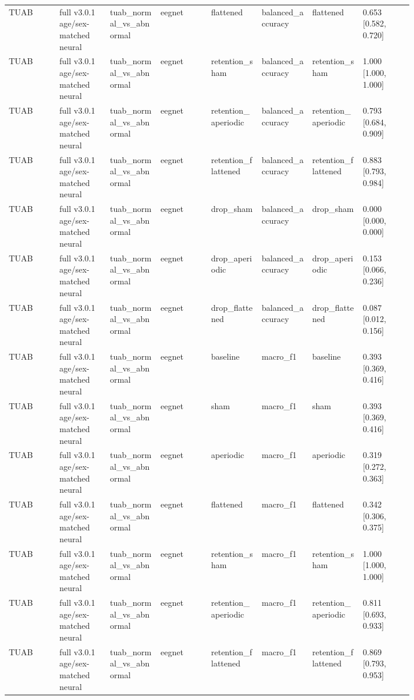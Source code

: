 \begin{longtable}{p{0.10\linewidth}p{0.10\linewidth}p{0.10\linewidth}p{0.10\linewidth}p{0.10\linewidth}p{0.10\linewidth}p{0.10\linewidth}p{0.10\linewidth}}
TUAB & full v3.0.1 age/sex-matched neural & tuab\_normal\_vs\_abnormal & eegnet & flattened & balanced\_accuracy & flattened & 0.653 [0.582, 0.720]\\
TUAB & full v3.0.1 age/sex-matched neural & tuab\_normal\_vs\_abnormal & eegnet & retention\_sham & balanced\_accuracy & retention\_sham & 1.000 [1.000, 1.000]\\
TUAB & full v3.0.1 age/sex-matched neural & tuab\_normal\_vs\_abnormal & eegnet & retention\_aperiodic & balanced\_accuracy & retention\_aperiodic & 0.793 [0.684, 0.909]\\
TUAB & full v3.0.1 age/sex-matched neural & tuab\_normal\_vs\_abnormal & eegnet & retention\_flattened & balanced\_accuracy & retention\_flattened & 0.883 [0.793, 0.984]\\
TUAB & full v3.0.1 age/sex-matched neural & tuab\_normal\_vs\_abnormal & eegnet & drop\_sham & balanced\_accuracy & drop\_sham & 0.000 [0.000, 0.000]\\
TUAB & full v3.0.1 age/sex-matched neural & tuab\_normal\_vs\_abnormal & eegnet & drop\_aperiodic & balanced\_accuracy & drop\_aperiodic & 0.153 [0.066, 0.236]\\
TUAB & full v3.0.1 age/sex-matched neural & tuab\_normal\_vs\_abnormal & eegnet & drop\_flattened & balanced\_accuracy & drop\_flattened & 0.087 [0.012, 0.156]\\
TUAB & full v3.0.1 age/sex-matched neural & tuab\_normal\_vs\_abnormal & eegnet & baseline & macro\_f1 & baseline & 0.393 [0.369, 0.416]\\
TUAB & full v3.0.1 age/sex-matched neural & tuab\_normal\_vs\_abnormal & eegnet & sham & macro\_f1 & sham & 0.393 [0.369, 0.416]\\
TUAB & full v3.0.1 age/sex-matched neural & tuab\_normal\_vs\_abnormal & eegnet & aperiodic & macro\_f1 & aperiodic & 0.319 [0.272, 0.363]\\
TUAB & full v3.0.1 age/sex-matched neural & tuab\_normal\_vs\_abnormal & eegnet & flattened & macro\_f1 & flattened & 0.342 [0.306, 0.375]\\
TUAB & full v3.0.1 age/sex-matched neural & tuab\_normal\_vs\_abnormal & eegnet & retention\_sham & macro\_f1 & retention\_sham & 1.000 [1.000, 1.000]\\
TUAB & full v3.0.1 age/sex-matched neural & tuab\_normal\_vs\_abnormal & eegnet & retention\_aperiodic & macro\_f1 & retention\_aperiodic & 0.811 [0.693, 0.933]\\
TUAB & full v3.0.1 age/sex-matched neural & tuab\_normal\_vs\_abnormal & eegnet & retention\_flattened & macro\_f1 & retention\_flattened & 0.869 [0.793, 0.953]\\

\end{longtable}

